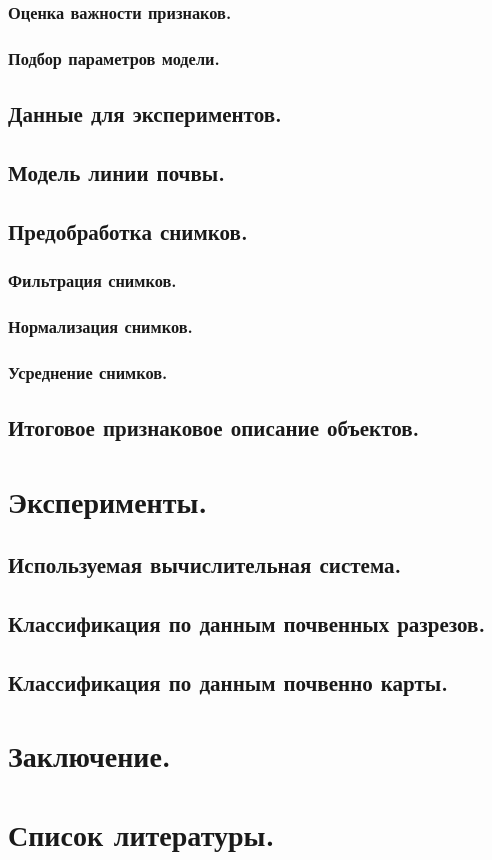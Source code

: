 \documentclass[12pt]{article}
\begin{document}
\subsubsection{Оценка важности признаков.}


\subsubsection{Подбор параметров модели.}


\subsection{Данные для экспериментов.}


\subsection{Модель линии почвы.}


\subsection{Предобработка снимков.}


\subsubsection{Фильтрация снимков.}


\subsubsection{Нормализация снимков.}


\subsubsection{Усреднение снимков.}


\subsection{Итоговое признаковое описание объектов.}


\section{Эксперименты.}


\subsection{Используемая вычислительная система.}


\subsection{Классификация по данным почвенных разрезов.}


\subsection{Классификация по данным почвенно карты.}


\section{Заключение.}


\section{Список литературы.}
\end{document}

